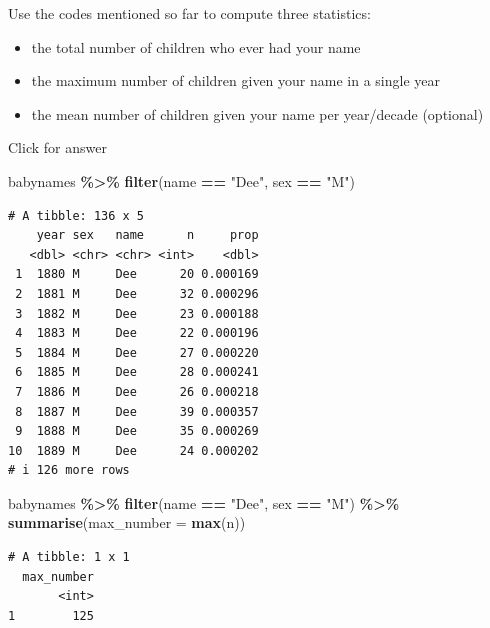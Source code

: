 \documentclass[
]{book}
\newenvironment{Shaded}{\begin{snugshade}}{\end{snugshade}}
\newcommand{\AttributeTok}[1]{\textcolor[rgb]{0.13,0.29,0.53}{#1}}
\newcommand{\FunctionTok}[1]{\textcolor[rgb]{0.13,0.29,0.53}{\textbf{#1}}}
\newcommand{\NormalTok}[1]{#1}
\newcommand{\SpecialCharTok}[1]{\textcolor[rgb]{0.81,0.36,0.00}{\textbf{#1}}}
\newcommand{\StringTok}[1]{\textcolor[rgb]{0.31,0.60,0.02}{#1}}
\providecommand{\tightlist}{%
  \setlength{\itemsep}{0pt}\setlength{\parskip}{0pt}}
\begin{document}
Use the codes mentioned so far to compute three statistics:

\begin{itemize}
\tightlist
\item
  the total number of children who ever had your name
\item
  the maximum number of children given your name in a single year
\item
  the mean number of children given your name per year/decade (optional)
\end{itemize}

Click for answer

\begin{Shaded}
\begin{Highlighting}[]
\NormalTok{babynames }\SpecialCharTok{\%\textgreater{}\%} 
  \FunctionTok{filter}\NormalTok{(name }\SpecialCharTok{==} \StringTok{"Dee"}\NormalTok{, sex }\SpecialCharTok{==} \StringTok{"M"}\NormalTok{)}
\end{Highlighting}
\end{Shaded}

\begin{verbatim}
# A tibble: 136 x 5
    year sex   name      n     prop
   <dbl> <chr> <chr> <int>    <dbl>
 1  1880 M     Dee      20 0.000169
 2  1881 M     Dee      32 0.000296
 3  1882 M     Dee      23 0.000188
 4  1883 M     Dee      22 0.000196
 5  1884 M     Dee      27 0.000220
 6  1885 M     Dee      28 0.000241
 7  1886 M     Dee      26 0.000218
 8  1887 M     Dee      39 0.000357
 9  1888 M     Dee      35 0.000269
10  1889 M     Dee      24 0.000202
# i 126 more rows
\end{verbatim}

\begin{Shaded}
\begin{Highlighting}[]
\NormalTok{babynames }\SpecialCharTok{\%\textgreater{}\%} 
  \FunctionTok{filter}\NormalTok{(name }\SpecialCharTok{==} \StringTok{"Dee"}\NormalTok{, sex }\SpecialCharTok{==} \StringTok{"M"}\NormalTok{) }\SpecialCharTok{\%\textgreater{}\%} 
  \FunctionTok{summarise}\NormalTok{(}\AttributeTok{max\_number =} \FunctionTok{max}\NormalTok{(n))}
\end{Highlighting}
\end{Shaded}

\begin{verbatim}
# A tibble: 1 x 1
  max_number
       <int>
1        125
\end{verbatim}
\end{document}
